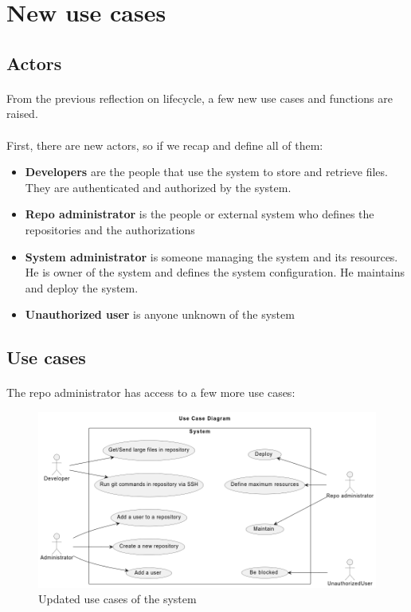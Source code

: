 \newpage
\section{New use cases}

\subsection{Actors}

\paragraph{}
From the previous reflection on lifecycle, a few new use cases and functions are raised.

\paragraph{}
First, there are new actors, so if we recap and define all of them:

\begin{itemize}
    \item \textbf{Developers} are the people that use the system to store and retrieve files. They are authenticated and authorized by the system.
    \item \textbf{Repo administrator} is the people or external system who defines the repositories and the authorizations
    \item \textbf{System administrator} is someone managing the system and its resources. He is owner of the system and defines the system configuration. He maintains and deploy the system.
    \item \textbf{Unauthorized user} is anyone unknown of the system
\end{itemize}

\subsection{Use cases}

\paragraph{}
The repo administrator has access to a few more use cases:

\begin{figure}[h]
    \centering
    \includegraphics[width=\textwidth]{iteration_02/diagrams/admin_use_cases.png}
    \caption{Updated use cases of the system}
    \label{fig:admin_use_cases}
\end{figure}


